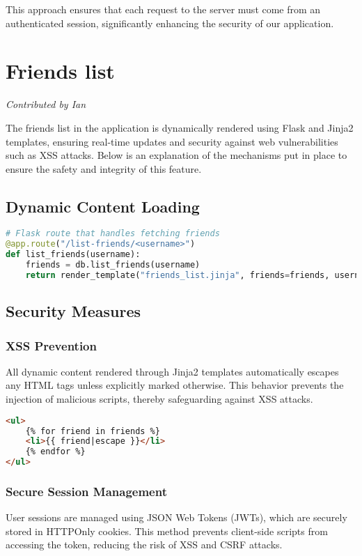 \documentclass{article}
\begin{document}
This approach ensures that each request to the server must come from an authenticated session, significantly enhancing the security of our application.

\section{Friends list}
\textit{Contributed by Ian}

The friends list in the application is dynamically rendered using Flask and Jinja2 templates, ensuring real-time updates and security against web vulnerabilities such as XSS attacks. Below is an explanation of the mechanisms put in place to ensure the safety and integrity of this feature.

\subsection{Dynamic Content Loading}

\begin{lstlisting}[language=Python, caption={Dynamically Loading Friends List}]
# Flask route that handles fetching friends
@app.route("/list-friends/<username>")
def list_friends(username):
    friends = db.list_friends(username)
    return render_template("friends_list.jinja", friends=friends, username=username)
\end{lstlisting}

\subsection{Security Measures}
\subsubsection{XSS Prevention}
All dynamic content rendered through Jinja2 templates automatically escapes any HTML tags unless explicitly marked otherwise. This behavior prevents the injection of malicious scripts, thereby safeguarding against XSS attacks.

\begin{lstlisting}[language=HTML, caption={Auto-escaping in Jinja2}]
<ul>
    {% for friend in friends %}
    <li>{{ friend|escape }}</li>
    {% endfor %}
</ul>
\end{lstlisting}

\subsubsection{Secure Session Management}
User sessions are managed using JSON Web Tokens (JWTs), which are securely stored in HTTPOnly cookies. This method prevents client-side scripts from accessing the token, reducing the risk of XSS and CSRF attacks.
\end{document}
